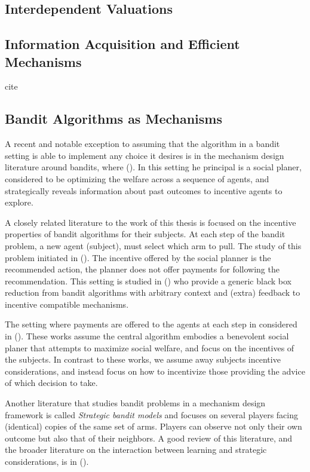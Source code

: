 \subsection{Interdependent Valuations}



\subsection{ Information Acquisition and Efficient Mechanisms}

% 
cite{}



\subsection{Bandit Algorithms as Mechanisms}


A recent and notable exception to assuming that the algorithm in a bandit setting is able to implement any choice it desires is in the mechanism design literature around bandits, where (\cite{kremer2014implementing,mansour2015bayesian}).
In this setting he principal is a social planer,  considered to be optimizing the welfare across a sequence of agents, and strategically reveals information about past outcomes to incentive agents to explore.

A closely related literature to the work of this thesis is focused on the incentive properties of bandit algorithms for their subjects.
At each step of the bandit problem, a new agent (subject), must select which arm to pull. 
The study of this problem initiated in (\cite{kremer2014implementing}).
The  incentive offered by the social planner is the recommended action, the planner does not offer payments for following the recommendation. This setting is studied in (\cite{mansour2015bayesian}) who provide a generic black box reduction from bandit algorithms with arbitrary context and (extra) feedback to incentive compatible mechanisms.

The setting where payments are offered to the agents at each step in considered in (\cite{frazier2014incentivizing}).
These works assume the central algorithm embodies a benevolent social planer that attempts to maximize social welfare, and focus on the incentives of the subjects.
In contrast to these works, we assume away subjects incentive considerations, and instead focus on how to incentivize those providing the advice of which decision to take.

Another literature that studies bandit problems in a mechanism design framework is called \emph{Strategic bandit models} and focuses on several players facing (identical) copies of the same set of arms. Players can observe not only their own outcome but also that of their neighbors. A good review of this literature, and the broader literature on the interaction between learning and strategic considerations, is in (\cite{horner2016learning}).

